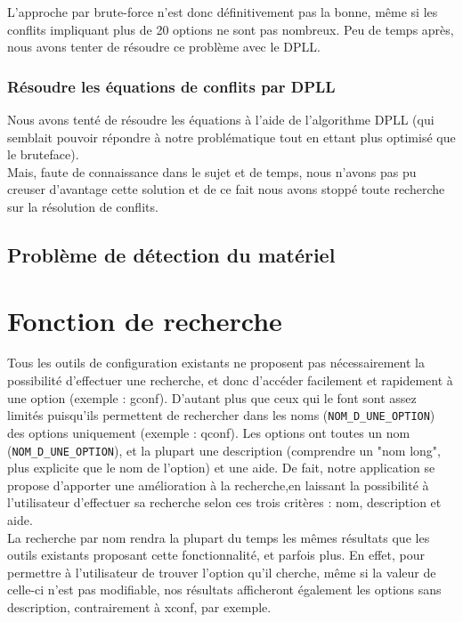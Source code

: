 \documentclass[17pts]{report}
\begin{document}
L'approche par brute-force n'est donc définitivement pas la bonne, même si les
conflits impliquant plus de 20 options ne sont pas nombreux.
Peu de temps après, nous avons tenter de résoudre ce problème avec le DPLL.\\

\subsubsection{Résoudre les équations de conflits par DPLL}
\label{ssub:Résoudre les équations de conflits par DPLL}

Nous avons tenté de résoudre les équations à l'aide de l'algorithme DPLL (qui
semblait pouvoir répondre à notre problématique tout en ettant plus optimisé
que le bruteface).\\
Mais, faute de connaissance dans le sujet et de temps, nous n'avons pas pu
creuser d'avantage cette solution et de ce fait nous avons stoppé toute
recherche sur la résolution de conflits.\\

\subsection{Problème de détection du matériel}
\label{sub:Problème de détection du matériel}

\section{Fonction de recherche}
\label{sec:Fonction de recherche}

Tous les outils de configuration existants ne proposent pas nécessairement la 
possibilité d'effectuer une recherche, et donc d'accéder facilement et rapidement
à une option (exemple : gconf). D'autant plus que ceux qui le font sont assez 
limités puisqu'ils permettent de rechercher dans les noms 
(\verb|NOM_D_UNE_OPTION|) des options uniquement (exemple : qconf). Les options
 ont toutes un nom (\verb|NOM_D_UNE_OPTION|), et la plupart une description 
(comprendre un "nom long", plus explicite que le nom de l'option) et une aide.
De fait, notre application se propose d'apporter une amélioration à la 
recherche,en laissant la possibilité à l'utilisateur d'effectuer sa recherche 
selon ces trois critères : nom, description et aide.\\

La recherche par nom rendra la plupart du temps les mêmes résultats que les 
outils existants proposant cette fonctionnalité, et parfois plus. En effet, 
pour permettre à l'utilisateur de trouver l'option qu'il cherche, même si 
la valeur de celle-ci n'est pas modifiable, nos résultats afficheront 
également les options sans description, contrairement à xconf, par exemple.\\
\end{document}
